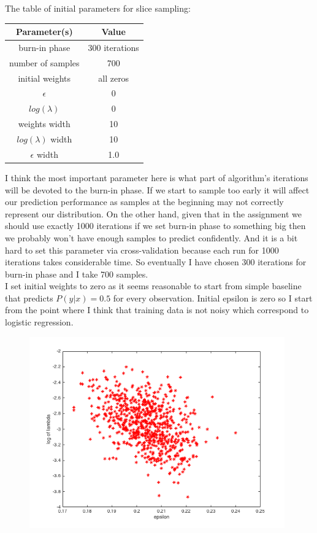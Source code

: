 \documentclass{article}
\begin{document}
\begin{enumerate}[label=(\alph*)]
						The table of initial parameters for slice sampling:
							\begin{center}
								\begin{tabular}{| c | c |}
									\hline
									Parameter(s) & Value\\
									\hline
									burn-in phase & 300 iterations \\
									\hline
									number of samples & 700 \\
									\hline
									initial weights & all zeros \\
									\hline
									$\epsilon$ & 0 \\
									\hline
									$log(\lambda)$ & 0 \\
									\hline
									weights width &  10 \\
									\hline
									$log(\lambda)$ width & 10 \\
									\hline
									$\epsilon$ width & 1.0 \\
									\hline
								\end{tabular}
							\end{center}
							I think the most important parameter here is what part of algorithm's iterations will be devoted to the burn-in phase. If we start to sample too early it will affect our prediction performance as samples at the beginning may not correctly represent our distribution. On the other hand, given that in the assignment we should use exactly 1000 iterations if we set burn-in phase to something big then we probably won't have enough samples to predict confidently. And it is a bit hard to set this parameter via cross-validation because each run for 1000 iterations takes considerable time. So eventually I have chosen 300 iterations for burn-in phase and I take 700 samples. \\
							I set initial weights to zero as it seems reasonable to start from simple baseline  that predicts $P(y | x) =0.5$ for every observation. Initial epsilon is zero so I start from the point where I think that training data is not noisy which correspond to logistic regression.\\
						 	\begin{figure}[htbp]
						 		\centering
						 		\includegraphics[width=11cm]{images/p2-3-b}

\end{figure}
\end{enumerate}
\end{document}
